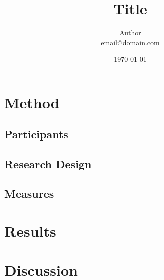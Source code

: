 \documentclass[doc,fignum,babel,english,noapacite]{apa}	%
\title{Title}
\date{\today}
\author{Author \\
{email@domain.com}}
\affiliation{Affiliation}
\begin{document}
\ifpdf
\else
\fi

\maketitle

\section{Method}\label{sec:method}

\subsection{Participants}\label{sec:method:participants}

\subsection{Research Design}\label{sec:method:researchdesign}

\subsection{Measures}\label{sec:method:measures}

\section{Results}\label{sec:results}

\section{Discussion}\label{sec:discussion}

\appendix

\end{document}
